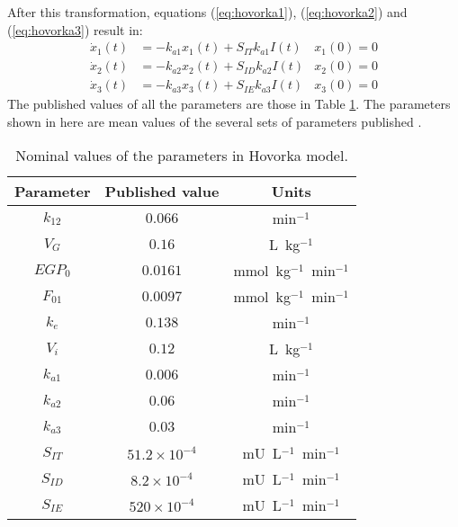 After this transformation, equations (\eqref{eq:hovorka1}), (\eqref{eq:hovorka2}) and (\eqref{eq:hovorka3}) result in:
\begin{align}
  \dot{x}_{1}(t) &= -k_{a1}x_{1}(t) + S_{IT}k_{a1}I(t) &  x_{1}(0)=0 \label{eq:hovorka10} \\
  \dot{x}_{2}(t) &= -k_{a2}x_{2}(t) + S_{ID}k_{a2}I(t) &  x_{2}(0)=0 \label{eq:hovorka11} \\
  \dot{x}_{3}(t) &= -k_{a3}x_{3}(t) + S_{IE}k_{a3}I(t) &  x_{3}(0)=0 \label{eq:hovorka12}
\end{align}
The published values of all the parameters are those in Table \ref{tab:hovorka}. The parameters shown in here are mean values of the several sets of parameters published \cite{hovorka2004nonlinear}.

\begin{table}[hbtp]
	\centering
		\begin{tabular}{|c c c|}
		\hline 
		Parameter & Published value & Units \\
		\hline 
		$k_{12}$ & $0.066$ & min$^{-1}$ \\
		$V_{G}$ & $0.16$ & L\ kg$^{-1}$ \\
		$EGP_{0}$ & $0.0161$ & mmol\ kg$^{-1}$\ min$^{-1}$ \\
		$F_{01}$ & $0.0097$ & mmol\ kg$^{-1}$\ min$^{-1}$ \\
		$k_{e}$ & $0.138$ & min$^{-1}$ \\
		$V_{i}$ & $0.12$ & L\ kg$^{-1}$ \\
		$k_{a1}$ & $0.006$ & min$^{-1}$ \\
		$k_{a2}$ & $0.06$ & min$^{-1}$ \\
		$k_{a3}$ & $0.03$ & min$^{-1}$ \\
		$S_{IT}$ & $51.2\times10^{-4}$ & mU\ L$^{-1}$\ min$^{-1}$ \\
		$S_{ID}$ & $8.2\times10^{-4}$ & mU\ L$^{-1}$\ min$^{-1}$ \\
		$S_{IE}$ & $520\times10^{-4}$ & mU\ L$^{-1}$\ min$^{-1}$ \\
		\hline
		\end{tabular}
	\caption{Nominal values of the parameters in Hovorka model.}
	\label{tab:hovorka}
\end{table}

